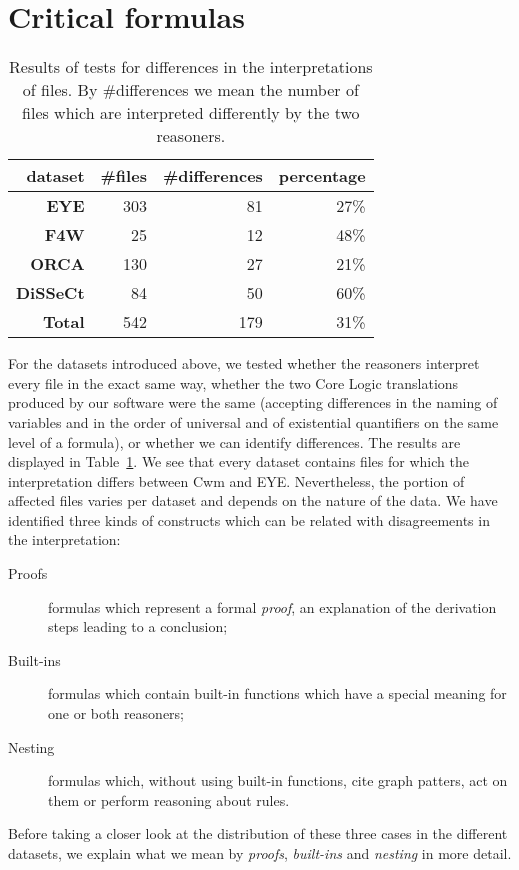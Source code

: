 \section{Critical formulas}\label{results}
\begin{table}
\begin{center}
\begin{tabular}{rrrr}
\hline
\bf dataset& \bf \#files & \bf \#differences & \bf percentage\\
\hline
 \bf EYE &303 & 81 &  27\%\\
 \bf F4W &25 & 12 &  48\% \\
 \bf ORCA & 130& 27 & 21\%\\
 \bf DiSSeCt & 84&50&  60\%\\
 \hline
 \bf Total & 542 & 179& 31\%\\
 \hline
\end{tabular}
\end{center}
\caption{Results of tests for differences in the interpretations of \nthree files. By \#differences we mean the number of files which are interpreted differently 
by the two reasoners.\label{result}}
\end{table}
For the datasets introduced above, we  tested whether the reasoners interpret every file in the exact same way, \ie whether the two 
\nthree Core Logic translations produced by our 
software were the same (accepting differences in the naming of variables and in the order of universal and of existential quantifiers on the same 
level of a formula), 
or whether we can identify differences. The results 
are displayed 
in Table~\ref{result}. We see that every dataset contains files for which the interpretation differs between Cwm and EYE. Nevertheless, 
the portion of affected files varies per dataset and depends on the nature of the data. We have identified three kinds of constructs which can be related with disagreements 
in the interpretation:
\begin{description}
  \item[Proofs] formulas which represent a formal \emph{proof}, \ie an explanation of the derivation steps leading to a conclusion; %
  \item[Built-ins] formulas which contain built-in functions which have a special meaning for one or both reasoners;
  \item[Nesting] formulas which, without using built-in functions, cite graph patters, act on them or perform
reasoning about rules.
\end{description}
Before taking a closer look at the distribution of these three cases in the different datasets, 
we explain what we mean by \emph{proofs}, \emph{built-ins} and \emph{nesting} in more detail.

